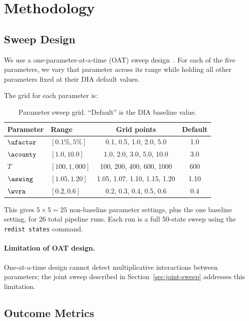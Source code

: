\section{Methodology}
\label{sec:methodology}

\subsection{Sweep Design}

We use a one-parameter-at-a-time (OAT) sweep design~\citep{morris1991}.
For each of the five parameters, we vary that parameter across its range
while holding all other parameters fixed at their DIA default values.

The grid for each parameter is:

\begin{table}[h]
\centering
\caption{Parameter sweep grid. ``Default'' is the DIA baseline value.}
\label{tab:sweep-grid}
\begin{tabular}{llcc}
\toprule
Parameter & Range & Grid points & Default \\
\midrule
$\ufactor$ & $[0.1\%, 5\%]$ & 0.1, 0.5, 1.0, 2.0, 5.0 & 1.0 \\
$\acounty$ & $[1.0, 10.0]$ & 1.0, 2.0, 3.0, 5.0, 10.0 & 3.0 \\
$T$ & $[100, 1{,}000]$ & 100, 200, 400, 600, 1000 & 600 \\
$\aswing$ & $[1.05, 1.20]$ & 1.05, 1.07, 1.10, 1.15, 1.20 & 1.10 \\
$\wvra$ & $[0.2, 0.6]$ & 0.2, 0.3, 0.4, 0.5, 0.6 & 0.4 \\
\bottomrule
\end{tabular}
\end{table}

This gives $5 \times 5 = 25$ non-baseline parameter settings,
plus the one baseline setting, for 26 total pipeline runs.
Each run is a full 50-state sweep using the \texttt{redist states}
command.

\paragraph{Limitation of OAT design.}
One-at-a-time design cannot detect multiplicative interactions between
parameters; the joint sweep described in Section~\ref{sec:joint-sweep}
addresses this limitation.

\subsection{Outcome Metrics}

